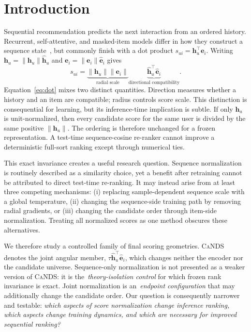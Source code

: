 \documentclass[sigconf,anonymous,review]{acmart}
\newcommand{\cands}{\textsc{CaNDS}}
\begin{document}
\section{Introduction}
Sequential recommendation predicts the next interaction from an ordered history. Recurrent, self-attentive, and masked-item models differ in how they construct a sequence state~\cite{hidasi2016gru4rec,kang2018sasrec,sun2019bert4rec}, but commonly finish with a dot product $s_{ui}=\bm h_u^\top\bm e_i$. Writing $\bm h_u=\|\bm h_u\|\widehat{\bm h}_u$ and $\bm e_i=\|\bm e_i\|\widehat{\bm e}_i$ gives
\begin{equation}
s_{ui}=\underbrace{\|\bm h_u\|\|\bm e_i\|}_{\text{radial scale}}\underbrace{\widehat{\bm h}_u^\top\widehat{\bm e}_i}_{\text{directional compatibility}}.\label{eq:dot}
\end{equation}
Equation~\ref{eq:dot} mixes two distinct quantities. Direction measures whether a history and an item are compatible; radius controls score scale. This distinction is consequential for learning, but its inference-time implication is subtle. If only $\bm h_u$ is unit-normalized, then every candidate score for the same user is divided by the same positive $\|\bm h_u\|$. The ordering is therefore unchanged for a frozen representation. A test-time sequence-cosine re-ranker cannot improve a deterministic full-sort ranking except through numerical ties.

This exact invariance creates a useful research question. Sequence normalization is routinely described as a similarity choice, yet a benefit after retraining cannot be attributed to direct test-time re-ranking. It may instead arise from at least three competing mechanisms: (i) replacing sample-dependent sequence scale with a global temperature, (ii) changing the sequence-side training path by removing radial gradients, or (iii) changing the candidate order through item-side normalization. Treating all normalized scores as one method obscures these alternatives.

We therefore study a controlled family of final scoring geometries. \cands{} denotes the joint angular member, $\tau\widehat{\bm h}_u^\top\widehat{\bm e}_i$, which changes neither the encoder nor the candidate universe. Sequence-only normalization is not presented as a weaker version of \cands{}: it is the \,\emph{theory-isolation control} for which frozen rank invariance is exact. Joint normalization is an \,\emph{endpoint configuration} that may additionally change the candidate order. Our question is consequently narrower and testable: \emph{which aspects of score normalization change inference ranking, which aspects change training dynamics, and which are necessary for improved sequential ranking?}
\end{document}

